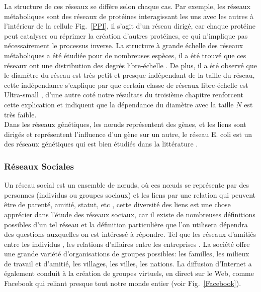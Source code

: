  La structure de ces réseaux se diffère selon chaque cas. Par exemple, les réseaux métaboliques sont des réseaux de protéines interagissant les uns avec les autres à l'intérieur de la cellule Fig.~\ref{PPI}, il s'agit d'un réseau dirigé, car chaque protéine peut catalyser ou réprimer la création d'autres protéines, ce qui n'implique pas nécessairement le processus inverse. La structure à grande échelle des réseaux métaboliques a été étudiée pour de nombreuses espèces, il a été trouvé que ces réseaux ont une distribution des degrés libre-échelle \cite{Je-al2000}. De plus, il a été observé que le diamètre du réseau est très petit et presque indépendant de la taille du réseau, cette indépendance s'explique par que certain classe de réseaux libre-échelle est Ultra-small \cite{Cohen-Havlin2003,Do-al2003,ChL2003}, d'une autre coté notre résultats du troisième chapitre renforcent cette explication et indiquent que la dépendance du diamètre avec la taille $N$ est très faible.\\ Dans les réseaux génétiques, les nœuds représentent des gènes, et les liens sont dirigés  et représentent l'influence d'un gène sur un autre, le réseau E. coli est un des réseaux génétiques qui est bien étudiés dans la littérature \cite{Mi-al2002}.


  \subsubsection{Réseaux Sociales}
  Un réseau social est un ensemble de nœuds, où ces nœuds se représente par des  personnes  (individus ou groupes sociaux) et les liens par une relation qui peuvent être de parenté, amitié, statut, etc \cite{JS2000}, cette diversité des liens est une chose apprécier dans l'étude des réseaux sociaux, car il existe de nombreuses définitions possibles d'un tel réseau et la définition particulière que l'on utilisera dépendra des questions auxquelles on est intéressé à répondre. Tel que les réseaux d'amitiés entre les individus \cite{WW1977,Mo1934}, les relations d'affaires entre les entreprises \cite{JP1977}.
  La société offre une grande variété d'organisations de groupes possibles: les familles, les milieux de travail et d'amitié, les villages, les villes, les nations. La diffusion d'Internet a également conduit à la création de groupes virtuels, en direct sur le Web, comme Facebook qui reliant presque tout  notre monde entier (voir Fig.~\ref{Facebook}).
  
